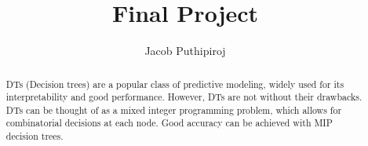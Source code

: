 \documentclass{article}
\begin{document}
\title{Final Project}
\author{Jacob Puthipiroj}
\maketitle

\begin{abstract}
	DTs (Decision trees) are a popular class of predictive modeling, widely used for its interpretability and good performance. However, DTs are not without their drawbacks. DTs can be thought of as a mixed integer programming problem, which allows for combinatorial decisions at each node. Good accuracy can be achieved with MIP decision trees. 
\end{abstract}


\end{document}
